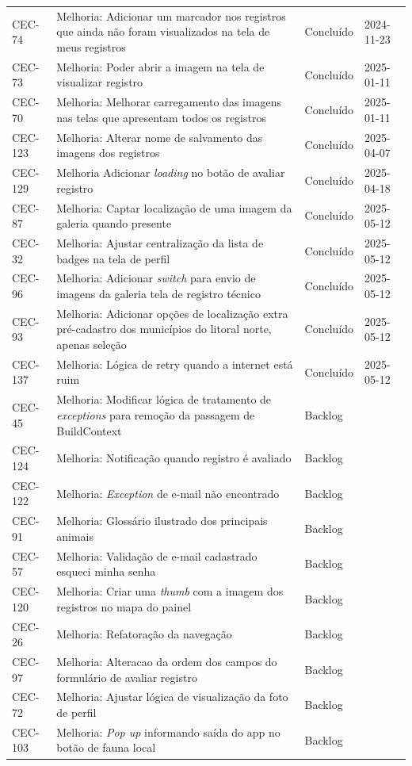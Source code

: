 \begin{longtable}{@{}lp{7cm}ll@{}}
\bottomrule
\endlastfoot
CEC-74 & Melhoria: Adicionar um marcador nos registros que ainda não foram visualizados na tela de meus registros & Concluído & 2024-11-23\\
CEC-73 & Melhoria: Poder abrir a imagem na tela de visualizar registro & Concluído & 2025-01-11 \\
CEC-70 & Melhoria: Melhorar carregamento das imagens nas telas que apresentam todos os registros & Concluído & 2025-01-11 \\
CEC-123 & Melhoria: Alterar nome de salvamento das imagens dos registros & Concluído & 2025-04-07 \\
CEC-129 & Melhoria Adicionar \textit{loading} no botão de avaliar registro & Concluído & 2025-04-18 \\
CEC-87 & Melhoria: Captar localização de uma imagem da galeria quando presente & Concluído & 2025-05-12 \\
CEC-32 & Melhoria: Ajustar centralização da lista de badges na tela de perfil & Concluído & 2025-05-12 \\
CEC-96 & Melhoria: Adicionar \textit{switch} para envio de imagens da galeria tela de registro técnico & Concluído & 2025-05-12 \\
CEC-93 & Melhoria: Adicionar opções de localização extra pré-cadastro dos municípios do litoral norte, apenas seleção & Concluído & 2025-05-12 \\
CEC-137 & Melhoria: Lógica de {retry} quando a internet está ruim & Concluído & 2025-05-12 \\
CEC-45 & Melhoria: Modificar lógica de tratamento de \textit{exceptions} para remoção da passagem de BuildContext & Backlog &  \\
CEC-124 & Melhoria: Notificação quando registro é avaliado & Backlog & \\
CEC-122 & Melhoria: \textit{Exception} de e-mail não encontrado & Backlog & \\
CEC-91 & Melhoria: Glossário ilustrado dos principais animais & Backlog & \\
CEC-57 & Melhoria: Validação de e-mail cadastrado esqueci minha senha & Backlog & \\
CEC-120 & Melhoria: Criar uma \textit{thumb} com a imagem dos registros no mapa do painel & Backlog & \\
CEC-26 & Melhoria: Refatoração da navegação & Backlog & \\
CEC-97 & Melhoria: Alteracao da ordem dos campos do formulário de avaliar registro & Backlog & \\
CEC-72 & Melhoria: Ajustar lógica de visualização da foto de perfil & Backlog & \\
CEC-103 & Melhoria: \textit{Pop up} informando saída do app no botão de fauna local & Backlog & \\

\end{longtable}
